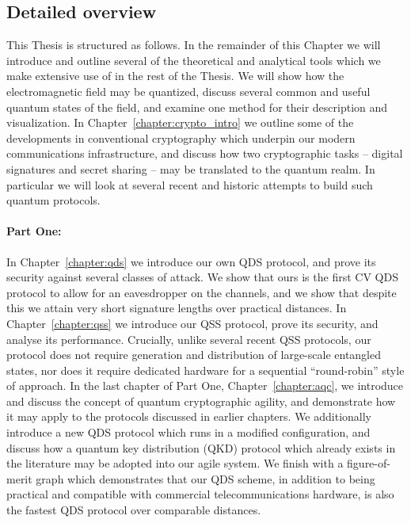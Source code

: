 \subsection*{Detailed overview}

This Thesis is structured as follows. In the remainder of this Chapter we will introduce and outline several of the theoretical and analytical tools which we make extensive use of in the rest of the Thesis. We will show how the electromagnetic field may be quantized, discuss several common and useful quantum states of the field, and examine one method for their description and visualization. In Chapter~\ref{chapter:crypto_intro} we outline some of the developments in conventional cryptography which underpin our modern communications infrastructure, and discuss how two cryptographic tasks -- digital signatures and secret sharing -- may be translated to the quantum realm. In particular we will look at several recent and historic attempts to build such quantum protocols.

\paragraph{Part One:} In Chapter~\ref{chapter:qds} we introduce our own QDS protocol, and prove its security against several classes of attack. We show that ours is the first CV QDS protocol to allow for an eavesdropper on the channels, and we show that despite this we attain very short signature lengths over practical distances. In Chapter~\ref{chapter:qss} we introduce our QSS protocol, prove its security, and analyse its performance. Crucially, unlike several recent QSS protocols, our protocol does not require generation and distribution of large-scale entangled states, nor does it require dedicated hardware for a sequential ``round-robin'' style of approach. In the last chapter of Part One, Chapter~\ref{chapter:aqc}, we introduce and discuss the concept of quantum cryptographic agility, and demonstrate how it may apply to the protocols discussed in earlier chapters. We additionally introduce a new QDS protocol which runs in a modified configuration, and discuss how a quantum key distribution (QKD) protocol which already exists in the literature may be adopted into our agile system. We finish with a figure-of-merit graph which demonstrates that our QDS scheme, in addition to being practical and compatible with commercial telecommunications hardware, is also the fastest QDS protocol over comparable distances. 

